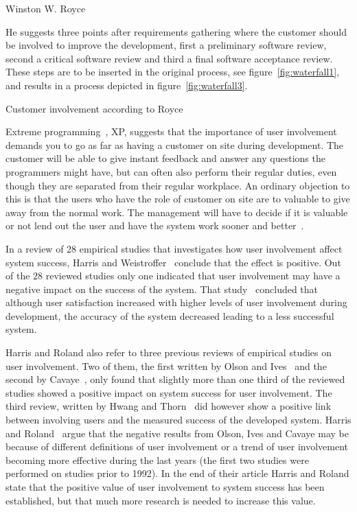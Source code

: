 \documentclass[a4paper]{report}
\begin{document}
	{Winston W. Royce~\cite{Royce:1987}}

He suggests three points after requirements gathering where the customer should be involved to improve the development, first a preliminary software review, second a critical software review and third a final software acceptance review. These steps are to be inserted in the original process, see figure~\ref{fig:waterfall1}, and results in a process depicted in figure~\ref{fig:waterfall3}.

	{Customer involvement according to Royce~\cite{Royce:1987}}

Extreme programming~\cite{Beck:1999}, XP, suggests that the importance of user involvement demands you to go as far as having a customer on site during development. The customer will be able to give instant feedback and answer any questions the programmers might have, but can often also perform their regular duties, even though they are separated from their regular workplace. An ordinary objection to this is that the users who have the role of customer on site are to valuable to give away from the normal work. The management will have to decide if it is valuable or not lend out the user and have the system work sooner and better~\cite{Beck:1999}.

In a review of 28 empirical studies that investigates how user involvement affect system success, Harris and Weistroffer~\cite{Harris-Roland:2009} conclude that the effect is positive. Out of the 28 reviewed studies only one indicated that user involvement may have a negative impact on the success of the system. That study~\cite{Lawrence-et-al:2002} concluded that although user satisfaction increased with higher levels of user involvement during development, the accuracy of the system decreased leading to a less successful system.

Harris and Roland also refer to three previous reviews of empirical studies on user involvement. Two of them, the first written by Olson and Ives~\cite{Olson-Ives:1981} and the second by Cavaye~\cite{Cavaye:1995}, only found that slightly more than one third of the reviewed studies showed a positive impact on system success for user involvement. The third review, written by Hwang and Thorn~\cite{Hwang-Thorn:1999} did however show a positive link between involving users and the measured success of the developed system. Harris and Roland~\cite{Harris-Roland:2009} argue that the negative results from Olson, Ives and Cavaye may be because of different definitions of user involvement or a trend of user involvement becoming more effective during the last years (the first two studies were performed on studies prior to 1992). In the end of their article Harris and Roland state that the positive value of user involvement to system success has been established, but that much more research is needed to increase this value.
\end{document}
